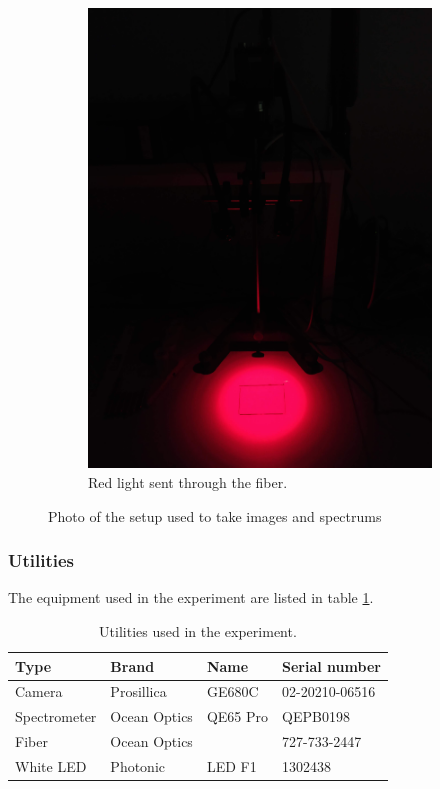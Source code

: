 \begin{figure}[h]
\begin{subfigure}{0.3333\textwidth}
        \includegraphics[width=0.95\linewidth]{figures/project_setup_red.png}
        \caption{Red light sent through the fiber.}
        \label{fig:picture_of_setup_red}
    \end{subfigure}
    \caption{Photo of the setup used to take images and spectrums}
    \label{fig:photo_of_setup}
\end{figure}

\subsubsection{Utilities}
The equipment used in the experiment are listed in table \ref{tb:utilities}.

\begin{table}[H]
    \centering
    \caption{Utilities used in the experiment.}
    \label{tb:utilities}
    \begin{tabular}{@{}llll@{}}
    \toprule
    Type         & Brand        & Name     & Serial number  \\ \midrule
    Camera       & Prosillica   & GE680C   & 02-20210-06516 \\
    Spectrometer & Ocean Optics & QE65 Pro & QEPB0198       \\
    Fiber        & Ocean Optics &          & 727-733-2447   \\
    White LED    & Photonic     & LED F1   & 1302438        \\ \bottomrule
    \end{tabular}
\end{table}

